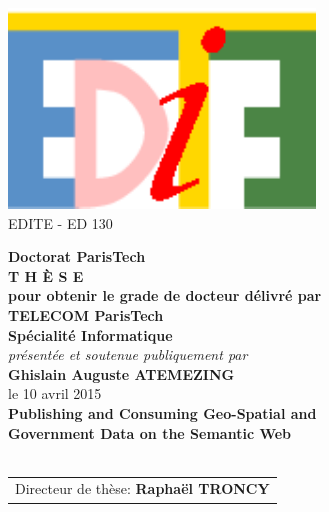 \documentclass[11pt,a4paper]{book}
\renewcommand\textnumero{n$^{\textsf{{\tiny O}}}$}
\begin{document}
\begin{center}
%


\includegraphics[scale=0.65]{logo_edite.pdf} \\
{\small {EDITE - ED 130}}


%
\vspace{.5cm}
%
%
%
%
%
%
\vspace{1.0cm}
%
%
%
{\LARGE {\bf Doctorat ParisTech}}\\
\vspace{1.1cm}
{\LARGE {\bf T H È S E}}\\
\vspace{0.5cm}
{\normalsize {\bf pour obtenir le grade de docteur délivré par}}\\
%
%
%
\vspace{.9cm}
%
%
%
%
{\LARGE {\bf TELECOM ParisTech}}\\
\vspace{0.6cm}
{\Large {\bf Spécialité \og Informatique \fg}}\\
%
%
%
\vspace{.8cm}
%
%
%
{\normalsize {\it présentée et soutenue publiquement par}}\\
\vspace{0.7cm}
{\Large {\bf Ghislain Auguste ATEMEZING}}\\
\vspace{0.24cm}
{\normalsize le 10 avril 2015}\\
%
%
%
\vfill
%
%
%
\textcolor[RGB]{191,18,56}{
\noindent
{\LARGE {\bf Publishing and Consuming Geo-Spatial and \\[.6cm]Government Data on the Semantic Web}}\\
}
%
%
\vfill~\vfill
%
%
%
{\normalsize
\begin{tabular}{c}
Directeur de thèse:					{\bf Raphaël TRONCY}\\
\end{tabular}
}
\end{center}
\end{document}
